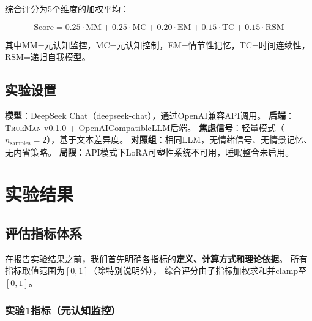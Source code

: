 \documentclass[11pt,a4paper]{article}
\newcommand{\TrueMan}{\textsc{TrueMan}}
\begin{document}
综合评分为5个维度的加权平均：

\begin{equation}
\text{Score} = 0.25 \cdot \text{MM} + 0.25 \cdot \text{MC} + 0.20 \cdot \text{EM} + 0.15 \cdot \text{TC} + 0.15 \cdot \text{RSM}
\label{eq:score}
\end{equation}

其中MM=元认知监控，MC=元认知控制，EM=情节性记忆，TC=时间连续性，RSM=递归自我模型。

\subsection{实验设置}

\textbf{模型}：DeepSeek Chat（deepseek-chat），通过OpenAI兼容API调用。
\textbf{后端}：\TrueMan{} v0.1.0 + OpenAICompatibleLLM后端。
\textbf{焦虑信号}：轻量模式（$n_{\text{samples}}=2$），基于文本差异度。
\textbf{对照组}：相同LLM，无情绪信号、无情景记忆、无内省策略。
\textbf{局限}：API模式下LoRA可塑性系统不可用，睡眠整合未启用。

\section{实验结果}

\subsection{评估指标体系}

在报告实验结果之前，我们首先明确各指标的\textbf{定义、计算方式和理论依据}。
所有指标取值范围为$[0,1]$（除特别说明外），
综合评分由子指标加权求和并clamp至$[0,1]$。

\subsubsection{实验1指标（元认知监控）}
\end{document}
